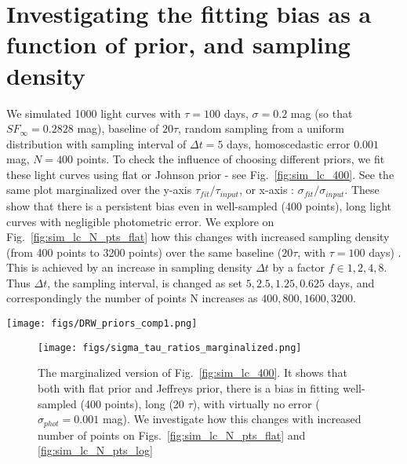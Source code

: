 \documentclass[fleqn,usenatbib]{mnras}  %
\begin{document}
\section{Investigating the fitting bias as a function of prior, and sampling density}
We simulated 1000 light curves with $\tau=100$ days, $\sigma=0.2$ mag (so that $SF_{\infty}=0.2828$ mag), baseline of $20 \tau$, random sampling from  a uniform distribution with sampling interval of $\Delta t=5$ days,   homoscedastic error $0.001$ mag, $N=400$ points. To check the influence of choosing different priors, we fit these light curves  using flat or Johnson prior - see Fig.~\ref{fig:sim_lc_400}. See the same plot marginalized over the y-axis $\tau_{fit} / \tau_{input}$, or x-axis : $\sigma_{fit} / \sigma_{input}$. These show that there is a persistent bias even in well-sampled (400 points), long light curves with negligible photometric error. We explore on Fig.~\ref{fig:sim_lc_N_pts_flat} how this changes with increased sampling density (from 400 points to 3200 points) over the same baseline ($20 \tau$, with $\tau=100$ days) . This is achieved by an increase in sampling density $\Delta t$ by a factor $f \in {1,2,4,8}$. Thus $\Delta t$, the sampling interval, is changed as set ${5,2.5, 1.25, 0.625} $ days, and correspondingly the number of points N increases as ${400,800,1600,3200}$.



\begin{figure*}
\texttt{[image: figs/DRW\_priors\_comp1.png]}
\caption{We plot results of fitting the simulated light curves with Celerite Real Term kernel, with flat (left), or Johnson prior (right). The cross shows the location of truth.  Both are offset, and Fig.~\ref{fig:sim_lc_400_marg} shows the marginalized version of that plot. We repeat the same experiment,  increasing the number of points tenfold to show the behavior of the bias. }
\label{fig:sim_lc_400}
\end{figure*} 


\begin{figure}
\texttt{[image: figs/sigma\_tau\_ratios\_marginalized.png]}
\caption{The marginalized version of Fig.~\ref{fig:sim_lc_400}. It shows that both with flat prior and Jeffreys prior,  there is a bias in fitting well-sampled (400 points), long (20 $\tau$), with virtually no error ($\sigma_{phot}=0.001 $ mag). We investigate how this changes with increased number of points on Figs.~\ref{fig:sim_lc_N_pts_flat} and \ref{fig:sim_lc_N_pts_log}}
\label{fig:sim_lc_400_marg}
\end{figure}
\end{document}
